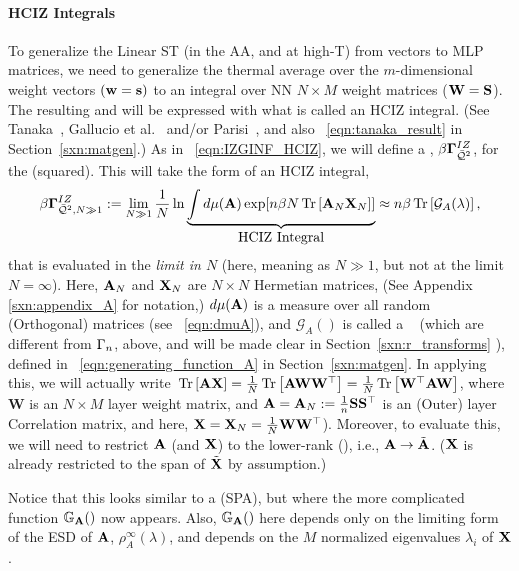 \paragraph{HCIZ Integrals}
To generalize the Linear ST \Perceptron (in the AA, and at high-T) from \Perceptron vectors to MLP matrices,
we need to generalize the thermal average over the $m$-dimensional \Perceptron weight vectors $({\mathbf{w}}={\mathbf{s}})$
to an integral over NN \Student $N \times M$ weight matrices (${\mathbf{W}}=\mathbf{S}$).
The resulting \PartitionFunction and \FreeEnergy will be expressed with what is called an HCIZ integral.
(See Tanaka~\cite{Tanaka2007, Tanaka2008}, Gallucio et al.~\cite{Bouchaud1998} and/or Parisi~\cite{PP95}, and also \EQN~\ref{eqn:tanaka_result} in Section~\ref{sxn:matgen}.)
As in \EQN~\ref{eqn:IZGINF_HCIZ}, we will define a \emph{\LayerQuality \GeneratingFunction}, $\beta\mathbf{\Gamma}^{IZ}_{\bar{\mathcal{Q}}^{2}}$, for the \LayerQuality (squared).
This will take the form of an HCIZ integral,
\begin{align}
\label{eqn:hciz_prelim}
\beta\mathbf{\Gamma}^{IZ}_{\bar{\mathcal{Q}}^{2},N\gg 1} := \lim_{N\gg 1}\frac{1}{N}\ln \underbrace{\int d\mu(\mathbf{A}) \exp[n\beta N\mbox{}\operatorname{Tr}\left[\mathbf{A}_N\mathbf{X}_N\right]] }_{\mbox{HCIZ Integral}} 
  \approx n\beta\mbox{}\operatorname{Tr}\left[\mathcal{G}_{A}(\lambda)\right]  ,
\end{align}
that is evaluated in the \WideLayer\emph{\LargeN limit in $N$} (here, meaning as $N \gg 1$, but not at the limit $N=\infty$).
Here, $\mathbf{A}_N$ and $\mathbf{X}_N$ are $N \times N$ Hermetian matrices, (See Appendix \ref{sxn:appendix_A} for notation,) $d\mu(\mathbf{A})$ is a measure
over all random (Orthogonal) matrices (see \EQN~\ref{eqn:dmuA}),
and $\mathcal{G}_{A}()$ is called a \GEN~
(which are different from $\Gamma_{n}$, above, and will be made clear in Section~\ref{sxn:r_transforms} ), defined in \EQN~\ref{eqn:generating_function_A} in Section~\ref{sxn:matgen}. 
In applying this, we will actually write $\mbox{}\operatorname{Tr}\left[\mathbf{A}\mathbf{X}\right]=\tfrac{1}{N}\mbox{}\operatorname{Tr}\left[\mathbf{A}{\mathbf{W}}{\mathbf{W}}^{\top}\right]=\tfrac{1}{N}\mbox{}\operatorname{Tr}\left[{\mathbf{W}}^{\top}\mathbf{A}{\mathbf{W}}\right]$,
where $\mathbf{W}$ is an $N \times M$ layer weight matrix, and $\mathbf{A}=\mathbf{A}_N:=\tfrac{1}{n}{\mathbf{S}}{\mathbf{S}}^{\top}$ is an (Outer) layer
Correlation matrix, and here,  $\mathbf{X}=\mathbf{X}_N=\tfrac{1}{N}{\mathbf{W}}{\mathbf{W}}^{\top}$).
Moreover, to evaluate this, we will need to restrict $\mathbf{A}$ (and $\mathbf{X}$)
to the lower-rank \EffectiveCorrelationSpace (\ECS),  i.e., $\mathbf{A}\rightarrow\tilde{\mathbf{A}}$. ($\mathbf{X}$ is already restricted to the span of $\tilde{\mathbf{X}}$ by \ECS assumption.)

Notice that this looks similar to a \SaddlePointApproximation (SPA), but where the more complicated function
$\mathbb{G}_{\mathbf{A}}()$ now appears.
Also, $\mathbb{G}_{\mathbf{A}}()$ here depends only on the limiting form of the ESD of $\mathbf{A}$, $\rho^{\infty}_{A}(\lambda)$,
and depends on the $M$ normalized eigenvalues $\lambda_{i}$ of $\mathbf{X}$.


